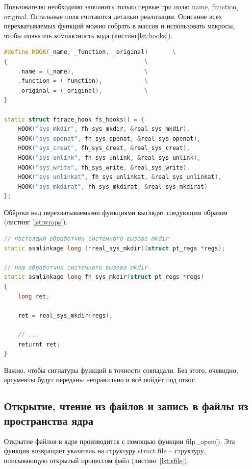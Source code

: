 \documentclass[a4paper,14pt]{article}
\begin{document}
Пользователю необходимо заполнить только первые три поля: name, function, original. Остальные поля считаются деталью реализации. Описание всех перехватываемых функций можно собрать в массив и использовать макросы, чтобы повысить компактность кода (листинг\ref{lst:hooks}).

\begin{lstlisting}[language=C++,label={lst:hooks}, caption=\text{Описание перехватываемых функций.}]
#define HOOK(_name, _function, _original)       \
{                                       \
	.name = (_name),                    \
	.function = (_function),            \
	.original = (_original),            \
}

static struct ftrace_hook fs_hooks[] = {
	HOOK("sys_mkdir", fh_sys_mkdir, &real_sys_mkdir),
	HOOK("sys_openat", fh_sys_openat, &real_sys_openat),
	HOOK("sys_creat", fh_sys_creat, &real_sys_creat),
	HOOK("sys_unlink", fh_sys_unlink, &real_sys_unlink),
	HOOK("sys_write", fh_sys_write, &real_sys_write),
	HOOK("sys_unlinkat", fh_sys_unlinkat, &real_sys_unlinkat),
	HOOK("sys_mkdirat", fh_sys_mkdirat, &real_sys_mkdirat)
};	
\end{lstlisting}

Обёртки над перехватываемыми функциями выглядят следующим образом (листинг \ref{lst:wraps}).

\begin{lstlisting}[language=C++,label={lst:wraps}, caption=\text{Обёртки над перехватываемыми функциями .}]
// настоящий обработчик системного вызова mkdir
static asmlinkage long (*real_sys_mkdir)(struct pt_regs *regs);

// наш обработчик системного вызова mkdir
static asmlinkage long fh_sys_mkdir(struct pt_regs *regs)
{
	long ret;

	ret = real_sys_mkdir(regs);

	// ...
	returnt ret;
}
\end{lstlisting}

Важно, чтобы сигнатуры функций в точности совпадали. Без этого, очевидно, аргументы будут переданы неправильно и всё пойдёт под откос.

\subsection{Открытие, чтение из файлов и запись в файлы из пространства ядра}

Открытие файлов в ядре производится с помощью функции filp\_open(). Эта функция возвращает указатель на структуру struct file -- структуру, описывающую открытый процессом файл (листинг \ref{lst:sfile}).
\end{document}
